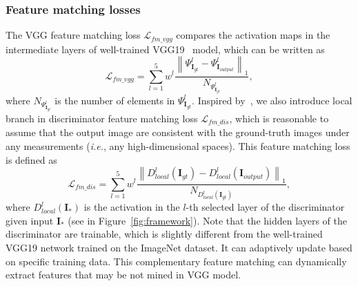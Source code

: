 \documentclass[journal]{IEEEtran}
\newcommand{\ie}{\emph{i.e.}}
\begin{document}
\subsubsection{Feature matching losses} 
The VGG feature matching loss ${{\mathcal L}_{fm\_vgg}}$ compares the activation maps in the intermediate layers of well-trained VGG19~\cite{VGG19} model, which can be written as
\begin{equation}\label{eq:vgg-fm}
{{\mathcal L}_{fm\_vgg}} = \sum\limits_{l = 1}^5 {{w^l}\frac{{{{\left\| {\Psi _{{\mathbf{I}_{gt}}}^l - \Psi _{{\mathbf{I}_{output}}}^l} \right\|}_1}}}{{{N_{\Psi _{{\mathbf{I}_{gt}}}^l}}}}} ,
\end{equation}
where ${N_{\Psi _{{\mathbf{I}_{gt}}}^l}}$ is the number of elements in $\Psi _{{\mathbf{I}_{gt}}}^l$. Inspired by~\cite{perceptual-adversarial}, we also introduce local branch in discriminator feature matching loss ${{\mathcal L}_{fm\_dis}}$, which is reasonable to assume that the output image are consistent with the ground-truth images under any measurements (\ie, any high-dimensional spaces). This feature matching loss is defined as
\begin{equation}\label{eq:dis-fm}
{{\mathcal L}_{fm\_dis}} = \sum\limits_{l = 1}^5 {{w^l}\frac{{{{\left\| {D_{local}^l\left( {{\mathbf{I}_{gt}}} \right) - D_{local}^l\left( {{\mathbf{I}_{output}}} \right)} \right\|}_1}}}{{{N_{D_{local}^l\left( {{\mathbf{I}_{gt}}} \right)}}}}} ,
\end{equation}
where $D_{local}^l\left( {{\mathbf{I}_ * }} \right)$ is the activation in the $l$-th selected layer of the discriminator given input ${\mathbf{I}_ * }$ (see in Figure~\ref{fig:framework}). Note that the hidden layers of the discriminator are trainable, which is slightly different from the well-trained VGG19 network trained on the ImageNet dataset. It can adaptively update based on specific training data. This complementary feature matching can dynamically extract features that may be not mined in VGG model. 
\end{document}
